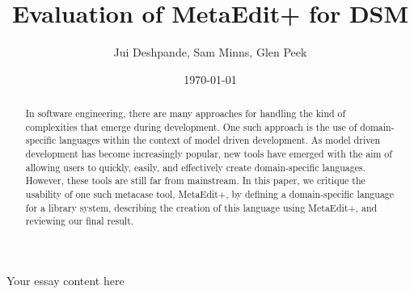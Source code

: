 \documentclass[12pt]{article}
\title{Evaluation of MetaEdit+ for DSM}
\author{Jui Deshpande, Sam Minns, Glen Peek}
\date{\today}
\begin{document}
\maketitle
\begin{abstract}
In software engineering, there are many approaches for handling the kind of complexities that emerge during development.  One such approach is the use of domain-specific languages within the context of model driven development.  As model driven development has become increasingly popular, new tools have emerged with the aim of allowing users to quickly, easily, and effectively create domain-specific languages.  However, these tools are still far from mainstream.  In this paper, we critique the usability of one such metacase tool, MetaEdit+, by defining a domain-specific language for a library system, describing the creation of this language using MetaEdit+, and reviewing our final result.  
\end{abstract}
Your essay content here


\end{document}
